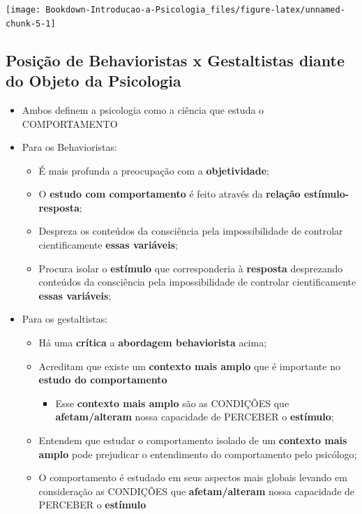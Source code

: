 \documentclass[
]{book}
\providecommand{\tightlist}{%
  \setlength{\itemsep}{0pt}\setlength{\parskip}{0pt}}
\begin{document}
\texttt{[image: Bookdown-Introducao-a-Psicologia\_files/figure-latex/unnamed-chunk-5-1]}

\hypertarget{posiuxe7uxe3o-de-behavioristas-x-gestaltistas-diante-do-objeto-da-psicologia}{%
\subsection{Posição de Behavioristas x Gestaltistas diante do Objeto da Psicologia}\label{posiuxe7uxe3o-de-behavioristas-x-gestaltistas-diante-do-objeto-da-psicologia}}

\begin{itemize}
\tightlist
\item
  Ambos definem a psicologia como a ciência que estuda o COMPORTAMENTO
\item
  Para os Behavioristas:

  \begin{itemize}
  \tightlist
  \item
    É mais profunda a preocupação com a \textbf{objetividade};
  \item
    O \textbf{estudo com comportamento} é feito através da \textbf{relação estímulo-resposta};
  \item
    Despreza os conteúdos da consciência pela impossibilidade de controlar cientificamente \textbf{essas variáveis};
  \item
    Procura isolar o \textbf{estímulo} que corresponderia à \textbf{resposta} desprezando conteúdos da consciência pela impossibilidade de controlar cientificamente \textbf{essas variáveis};
  \end{itemize}
\item
  Para os gestaltistas:

  \begin{itemize}
  \tightlist
  \item
    Há uma \textbf{crítica} a \textbf{abordagem behaviorista} acima;
  \item
    Acreditam que existe um \textbf{contexto mais amplo} que é importante no \textbf{estudo do comportamento}

    \begin{itemize}
    \tightlist
    \item
      Esse \textbf{contexto mais amplo} são as CONDIÇÕES que \textbf{afetam/alteram} nossa capacidade de PERCEBER o \textbf{estímulo};
    \end{itemize}
  \item
    Entendem que estudar o comportamento isolado de um \textbf{contexto mais amplo} pode prejudicar o entendimento do comportamento pelo psicólogo;
  \item
    O comportamento é estudado em seus aspectos mais globais levando em consideração as CONDIÇÕES que \textbf{afetam/alteram} nossa capacidade de PERCEBER o \textbf{estímulo}
  \end{itemize}
\end{itemize}
\end{document}
